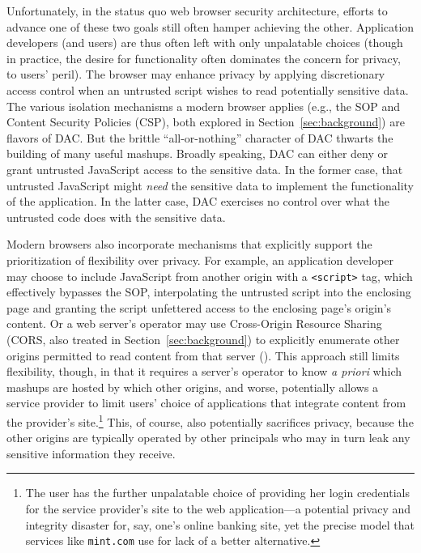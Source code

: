 Unfortunately, in the status quo web browser security architecture,
efforts to advance one of these two goals still often hamper achieving
the other. Application developers (and users) are thus often left with
only unpalatable choices (though in practice, the desire for
functionality often dominates the concern for privacy, to users'
peril). The browser may enhance privacy by applying discretionary
access control when an untrusted script wishes to read
potentially sensitive data. The various isolation mechanisms a modern
browser applies (e.g., the SOP and Content Security Policies (CSP),
both explored in Section~\ref{sec:background}) are flavors of DAC. But
the brittle ``all-or-nothing'' character of DAC thwarts the building
of many useful mashups. Broadly speaking, DAC can either deny or grant
untrusted JavaScript access to the sensitive data. In the former case,
that untrusted JavaScript might {\em need} the sensitive data to
implement the functionality of the application. In the latter case,
DAC exercises no control over what the untrusted code does with the
sensitive data.

Modern browsers also incorporate mechanisms that explicitly support
the prioritization of flexibility over privacy. For example, an
application developer may choose to include JavaScript from another
origin with a {\tt <script>} tag, which effectively bypasses the SOP,
interpolating the untrusted script into the enclosing page and
granting the script unfettered access to the enclosing page's origin's
content. Or a web server's operator may use Cross-Origin Resource
Sharing (CORS, also treated in Section~\ref{sec:background}) to
explicitly enumerate other origins permitted to read content from that
server ().
This approach still limits flexibility, though, in that it requires a
server's operator to know {\em a priori} which mashups are hosted by
which other origins, and worse, potentially allows a service provider
to limit users' choice of applications that integrate content from the
provider's site.\footnote{The user has the further unpalatable
  choice of providing her login credentials for the service
  provider's site to the web application---a potential
  privacy and integrity disaster for, say, one's online banking site,
  yet the precise model that services like {\tt mint.com} use for lack
  of a better alternative.} This, of course, also potentially sacrifices
privacy, because the other origins are typically operated by other
principals who may in turn leak any sensitive information they
receive.

